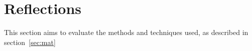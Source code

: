 \documentclass[10pt,a4paper]{article}
\begin{document}
\section{Reflections}
\label{sec:ref}

This section aims to evaluate the methods and techniques used, as described in section~\ref{sec:mat}
\end{document}

